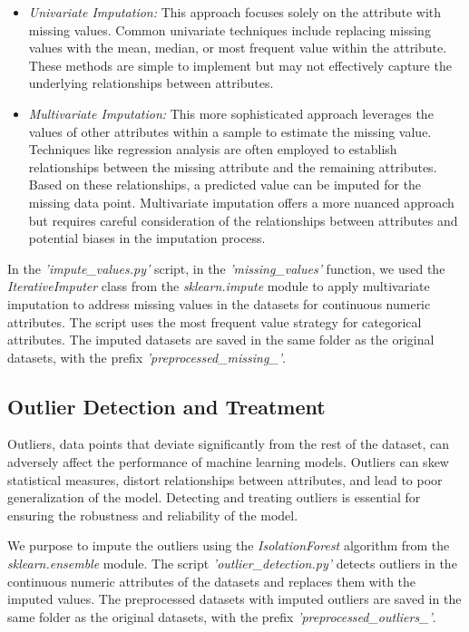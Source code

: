 \documentclass[runningheads]{paper}
\begin{document}
\begin{itemize}
    \item \textit{Univariate Imputation:} This approach focuses solely on the attribute with missing 
    values. Common univariate techniques include replacing missing values with the 
    mean, median, or most frequent value within the attribute. These methods are 
    simple to implement but may not effectively capture the underlying relationships 
    between attributes.
    \item \textit{Multivariate Imputation:} This more sophisticated approach leverages the values 
    of other attributes within a sample to estimate the missing value. Techniques 
    like regression analysis are often employed to establish relationships between 
    the missing attribute and the remaining attributes. Based on these relationships, 
    a predicted value can be imputed for the missing data point.  Multivariate 
    imputation offers a more nuanced approach but requires careful consideration 
    of the relationships between attributes and potential biases in the imputation 
    process.
\end{itemize}

In the \textit{'impute\_values.py'} script, in the \textit{'missing\_values'} function,
we used the \textit{IterativeImputer}
class from the \textit{sklearn.impute} module to apply multivariate imputation to
address missing values in the datasets for continuous numeric attributes. The script
uses the most frequent value strategy for categorical attributes. The imputed datasets
are saved in the same folder as the original datasets, with the prefix
\textit{'preprocessed\_missing\_'}.

\subsection{Outlier Detection and Treatment}
Outliers, data points that deviate significantly from the rest of the dataset,
can adversely affect the performance of machine learning models. Outliers can
skew statistical measures, distort relationships between attributes, and lead to
poor generalization of the model. Detecting and treating outliers is essential
for ensuring the robustness and reliability of the model.

We purpose to impute the outliers using the \textit{IsolationForest} algorithm
from the \textit{sklearn.ensemble} module. The script \textit{'outlier\_detection.py'}
detects outliers in the continuous numeric attributes of the datasets and replaces
them with the imputed values. The preprocessed datasets with imputed outliers are
saved in the same folder as the original datasets, with the prefix
\textit{'preprocessed\_outliers\_'}.
\end{document}

